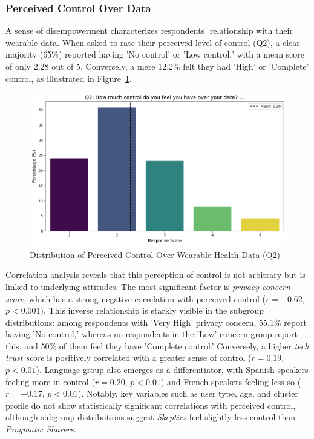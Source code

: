 	\subsubsection{Perceived Control Over Data}
		A sense of disempowerment characterizes respondents' relationship with their wearable data. When asked to rate their perceived level of control (Q2), a clear majority (65\%) reported having 'No control' or 'Low control,' with a mean score of only 2.28 out of 5. Conversely, a mere 12.2\% felt they had 'High' or 'Complete' control, as illustrated in Figure~\ref{fig:perceived_control_q2}.
		\begin{figure}
			\centering
			\includegraphics[width=1\linewidth]{figures/questions/Q2_likert.png}
			\caption{Distribution of Perceived Control Over Wearable Health Data (Q2)}
			\label{fig:perceived_control_q2}
		\end{figure}
		Correlation analysis reveals that this perception of control is not arbitrary but is linked to underlying attitudes. The most significant factor is \textit{privacy concern score}, which has a strong negative correlation with perceived control ($r = -0.62$, $p < 0.001$). This inverse relationship is starkly visible in the subgroup distributions: among respondents with 'Very High' privacy concern, 55.1\% report having 'No control,' whereas no respondents in the 'Low' concern group report this, and 50\% of them feel they have 'Complete control.'
		Conversely, a higher \textit{tech trust score} is positively correlated with a greater sense of control ($r = 0.19$, $p < 0.01$). Language group also emerges as a differentiator, with Spanish speakers feeling more in control ($r = 0.20$, $p < 0.01$) and French speakers feeling less so ($r = -0.17$, $p < 0.01$). Notably, key variables such as user type, age, and cluster profile do not show statistically significant correlations with perceived control, although subgroup distributions suggest \textit{Skeptics} feel slightly less control than \textit{Pragmatic Sharers}.
